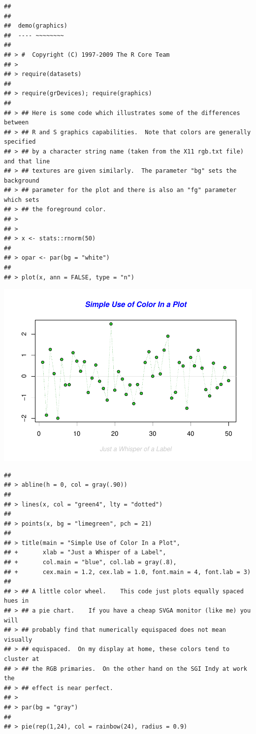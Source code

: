 \documentclass[
]{book}
\begin{document}
\begin{verbatim}
## 
## 
##  demo(graphics)
##  ---- ~~~~~~~~
## 
## > #  Copyright (C) 1997-2009 The R Core Team
## > 
## > require(datasets)
## 
## > require(grDevices); require(graphics)
## 
## > ## Here is some code which illustrates some of the differences between
## > ## R and S graphics capabilities.  Note that colors are generally specified
## > ## by a character string name (taken from the X11 rgb.txt file) and that line
## > ## textures are given similarly.  The parameter "bg" sets the background
## > ## parameter for the plot and there is also an "fg" parameter which sets
## > ## the foreground color.
## > 
## > 
## > x <- stats::rnorm(50)
## 
## > opar <- par(bg = "white")
## 
## > plot(x, ann = FALSE, type = "n")
\end{verbatim}

\includegraphics{bookdown-demo_files/figure-latex/unnamed-chunk-5-1.pdf}

\begin{verbatim}
## 
## > abline(h = 0, col = gray(.90))
## 
## > lines(x, col = "green4", lty = "dotted")
## 
## > points(x, bg = "limegreen", pch = 21)
## 
## > title(main = "Simple Use of Color In a Plot",
## +       xlab = "Just a Whisper of a Label",
## +       col.main = "blue", col.lab = gray(.8),
## +       cex.main = 1.2, cex.lab = 1.0, font.main = 4, font.lab = 3)
## 
## > ## A little color wheel.    This code just plots equally spaced hues in
## > ## a pie chart.    If you have a cheap SVGA monitor (like me) you will
## > ## probably find that numerically equispaced does not mean visually
## > ## equispaced.  On my display at home, these colors tend to cluster at
## > ## the RGB primaries.  On the other hand on the SGI Indy at work the
## > ## effect is near perfect.
## > 
## > par(bg = "gray")
## 
## > pie(rep(1,24), col = rainbow(24), radius = 0.9)
\end{verbatim}
\end{document}
